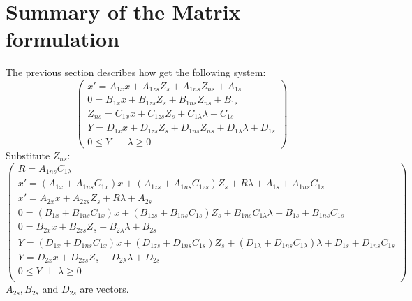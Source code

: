 \section{Summary of  the Matrix formulation}

The previous section describes how get the following system:
\[\left(\begin{array}{c}
x'=A_{1x}x +A_{1zs}Z_{s} + A_{1ns}Z_{ns}+A_{1s}\\
0=B_{1x}x+B_{1zs}Z_{s} + B_{1ns}Z_{ns}+B_{1s}\\
Z_{ns}= C_{1x}x+C_{1zs}Z_{s}+C_{1\lambda}\lambda +C_{1s}\\
Y=D_{1x}x +D_{1zs}Z_{s}+D_{1ns}Z_{ns}+D_{1\lambda}\lambda+D_{1s}\\
0 \leq Y \, \perp \, \lambda \geq 0
\end{array}\right)\]
Substitute $Z_{ns}$:
\[\left(\begin{array}{c}
R=A_{1ns}C_{1\lambda}\\
x'=(A_{1x}+A_{1ns}C_{1x})x +(A_{1zs}+A_{1ns}C_{1zs})Z_{s} +R\lambda+A_{1s} + A_{1ns}C_{1s}\\
x'=A_{2x}x +A_{2zs}Z_{s} +R \lambda +A_{2s}\\
0=(B_{1x}+B_{1ns}C_{1x})x+(B_{1zs}+B_{1ns}C_{1s})Z_{s} + B_{1ns}C_{1\lambda}\lambda +B_{1s} + B_{1ns}C_{1s} \\
0=B_{2x}x+B_{2zs}Z_{s} + B_{2\lambda}\lambda + B_{2s}\\
Y=(D_{1x}+D_{1ns}C_{1x})x+(D_{1zs}+D_{1ns}C_{1s})Z_{s}+(D_{1\lambda}+D_{1ns}C_{1\lambda})\lambda +D_{1s}+D_{1ns}C_{1s}\\
Y=D_{2x}x+D_{2zs}Z_{s}+D_{2\lambda}\lambda + D_{2s} \\
0 \leq Y \, \perp \, \lambda \geq 0\\
\end{array}\right)\]
$A_{2s}, B_{2s}$ and $D_{2s}$ are vectors.



